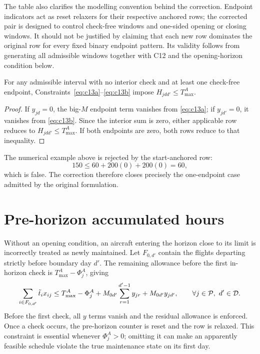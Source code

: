 The table also clarifies the modelling convention behind the correction.
Endpoint indicators act as reset relaxers for their respective anchored rows;
the corrected pair is designed to control check-free windows and one-sided
opening or closing windows. It should not be justified by claiming that each
new row dominates the original row for every fixed binary endpoint pattern.
Its validity follows from generating all admissible windows together with C12
and the opening-horizon condition below.

\begin{proposition}
    \label{prop:c13_check_free_windows}
    For any admissible interval with no interior check and at least one
    check-free endpoint, Constraints~\eqref{eq:c13a}--\eqref{eq:c13b} impose
    $H_{jdd'}\leq T_{\max}^{A}$.
\end{proposition}
\begin{proof}
    If $y_{jd}=0$, the big-$M$ endpoint term vanishes from
    \eqref{eq:c13a}; if $y_{jd'}=0$, it vanishes from
    \eqref{eq:c13b}. Since the interior sum is zero, either applicable row
    reduces to $H_{jdd'}\leq T_{\max}^{A}$. If both endpoints are zero, both
    rows reduce to that inequality.
\end{proof}

The numerical example above is rejected by the start-anchored row:
\begin{equation}
    150\leq60+200(0)+200(0)=60,
    \label{eq:c13_counterexample_corrected}
\end{equation}
which is false. The correction therefore closes precisely the one-endpoint
case admitted by the original formulation.

\section{Pre-horizon accumulated hours}

Without an opening condition, an aircraft entering the horizon close to its
limit is incorrectly treated as newly maintained. Let $F_{0,d'}$ contain the
flights departing strictly before boundary day $d'$. The remaining
allowance before the first in-horizon check is
$T_{\max}^{A}-\Phi_j^A$, giving
\begin{equation}
    \sum_{i\in F_{0,d'}}\tilde t_i x_{ij}
    \leq T_{\max}^{A}-\Phi_j^A
    +M_{0d'}\sum_{r=1}^{d'-1}y_{jr}
    +M_{0d'}y_{jd'},
    \qquad \forall j\in\mathcal{P},\ d'\in\mathcal{D}.
    \label{eq:c13_initial_hours}
\end{equation}
Before the first check, all $y$ terms vanish and the residual allowance is
enforced. Once a check occurs, the pre-horizon counter is reset and the row is
relaxed. This constraint is essential whenever $\Phi_j^A>0$; omitting it can
make an apparently feasible schedule violate the true maintenance state on
its first day.

